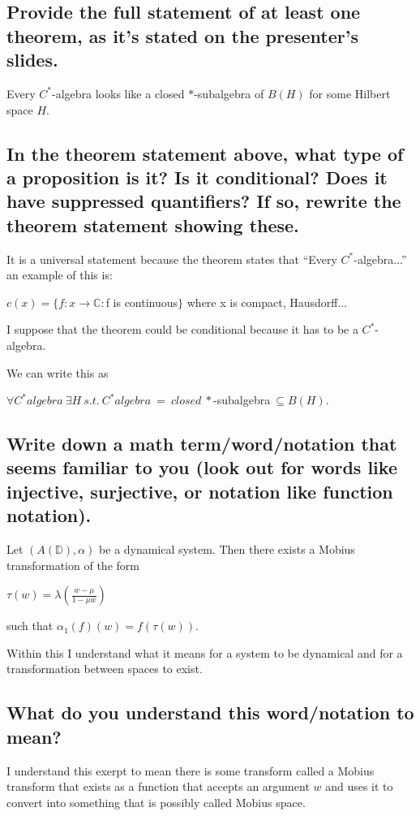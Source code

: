 
\subsection{Provide the full statement of at least one theorem, as it’s stated on the presenter’s slides.}
Every $C^*$-algebra looks like a closed $*$-subalgebra of $B(H)$ for some Hilbert space $H$.

\subsection{In the theorem statement above, what type of a proposition is it? Is it conditional? Does it have suppressed quantifiers? If so, rewrite the theorem statement showing these.}
It is a universal statement because the theorem states that ``Every $C^*$-algebra...'' an example of this is:

\begin{center}
  $c(x) = \{f : x \rightarrow \mathbb{C} : $f is continuous$\}$ where x is compact, Hausdorff...
\end{center}

I suppose that the theorem could be conditional because it has to be a $C^*$-algebra.

We can write this as
\begin{center}
  $\forall C^* algebra~\exists H ~s.t. ~C^* algebra~ = ~closed~*$-subalgebra$~ \subseteq B(H)$.
\end{center}

\subsection{Write down a math term/word/notation that seems familiar to you (look out for words like injective, surjective, or notation like function notation).}
Let $(A(\mathbb{D}), \alpha)$ be a dynamical system. Then there exists a Mobius transformation of the form

\begin{center}
  $\tau(w) = \lambda (\frac{w-\mu}{1-\mu\bar w})$
\end{center}
such that $\alpha_1(f)(w) = f(\tau(w))$.

Within this I understand what it means for a system to be dynamical and for a transformation between spaces to exist.

\subsection{What do you understand this word/notation to mean?}
I understand this exerpt to mean there is some transform called a Mobius transform that exists as a function that accepts an argument $w$ and uses it to convert into something that is possibly called Mobius space.


